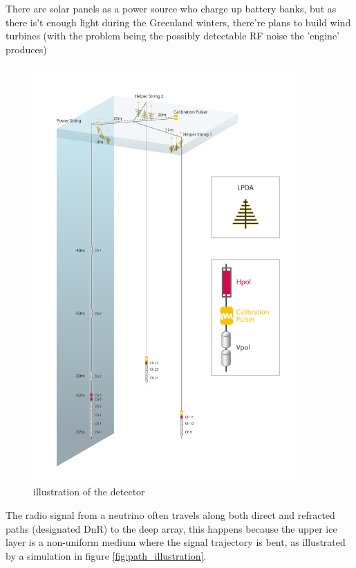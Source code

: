 \documentclass[11pt,a4paper,faculty=we,language=en,doctype=report]{cls/ugent-doc}
\begin{document}
There are solar panels as a power source who charge up battery banks, but as there is't enough light during the Greenland winters, there're plans to build wind turbines (with the problem being the possibly detectable RF noise the 'engine' produces)

\begin{figure}
	\includegraphics[width=0.9\textwidth]{figures/detector.pdf}	
	\caption{illustration of the detector}
	\label{fig:detector}
\end{figure}
\newpage
The radio signal from a neutrino often travels along both direct and refracted paths (designated DnR) to the deep array, this happens because the upper ice layer is a non-uniform medium where the signal trajectory is bent, as illustrated by a simulation in figure \ref{fig:path_illustration}. 
\end{document}
